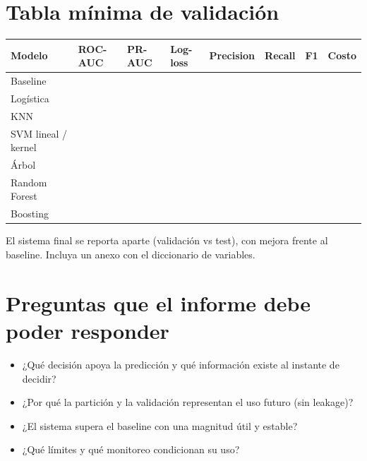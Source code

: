 \documentclass[11pt,letterpaper]{article}
\begin{document}
\section*{Tabla mínima de validación}
\begin{center}\small
\begin{tabular}{llllllll}
\toprule
Modelo & ROC-AUC & PR-AUC & Log-loss & Precision & Recall & F1 & Costo \\
\midrule
Baseline & & & & & & & \\
Logística & & & & & & & \\
KNN & & & & & & & \\
SVM lineal / kernel & & & & & & & \\
Árbol & & & & & & & \\
Random Forest & & & & & & & \\
Boosting & & & & & & & \\
\bottomrule
\end{tabular}\end{center}

El sistema final se reporta aparte (validación vs test), con mejora frente al baseline. Incluya un anexo con el diccionario de variables.

\section*{Preguntas que el informe debe poder responder}
\begin{itemize}
\item ¿Qué decisión apoya la predicción y qué información existe al instante de decidir?
\item ¿Por qué la partición y la validación representan el uso futuro (sin leakage)?
\item ¿El sistema supera el baseline con una magnitud útil y estable?
\item ¿Qué límites y qué monitoreo condicionan su uso?
\end{itemize}
\end{document}
